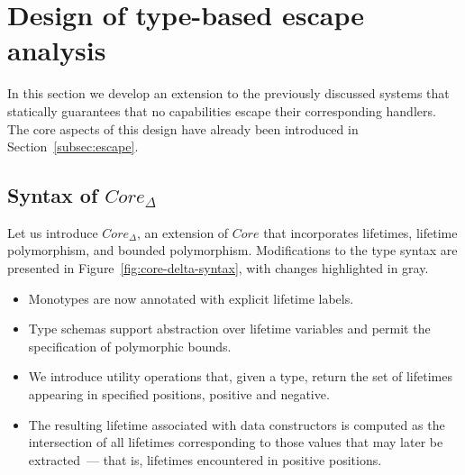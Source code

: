 \documentclass[acmsmall]{acmart}
\begin{document}




\section{Design of type-based escape analysis} \label{sec:escape}

In this section we develop an extension to the previously discussed systems that statically guarantees that no capabilities escape their corresponding handlers.
The core aspects of this design have already been introduced in Section~\ref{subsec:escape}.

\subsection{Syntax of $Core_\Delta$}

Let us introduce $Core_\Delta$, an extension of $Core$ that incorporates lifetimes, lifetime polymorphism, and bounded polymorphism.
Modifications to the type syntax are presented in Figure~\ref{fig:core-delta-syntax}, with changes highlighted in gray.
\begin{itemize}
    \item Monotypes are now annotated with explicit lifetime labels.
    \item Type schemas support abstraction over lifetime variables and permit the specification of polymorphic bounds.
    \item We introduce utility operations that, given a type, return the set of lifetimes appearing in specified positions, positive and negative. %
    \item The resulting lifetime associated with data constructors is computed as the intersection of all lifetimes corresponding to those values that may later be extracted~--- that is, lifetimes encountered in positive positions.
\end{itemize}
\end{document}
